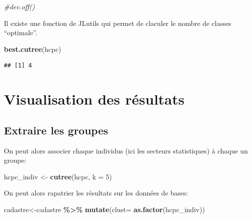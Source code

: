 \documentclass[
]{book}
\newenvironment{Shaded}{\begin{snugshade}}{\end{snugshade}}
\newcommand{\AttributeTok}[1]{\textcolor[rgb]{0.13,0.29,0.53}{#1}}
\newcommand{\CommentTok}[1]{\textcolor[rgb]{0.56,0.35,0.01}{\textit{#1}}}
\newcommand{\DecValTok}[1]{\textcolor[rgb]{0.00,0.00,0.81}{#1}}
\newcommand{\FunctionTok}[1]{\textcolor[rgb]{0.13,0.29,0.53}{\textbf{#1}}}
\newcommand{\NormalTok}[1]{#1}
\newcommand{\OtherTok}[1]{\textcolor[rgb]{0.56,0.35,0.01}{#1}}
\newcommand{\SpecialCharTok}[1]{\textcolor[rgb]{0.81,0.36,0.00}{\textbf{#1}}}
\begin{document}
\begin{Shaded}
\begin{Highlighting}[]
\CommentTok{\#dev.off()}
\end{Highlighting}
\end{Shaded}

Il existe une fonction de JLutils qui permet de claculer le nombre de classes ``optimale''.

\begin{Shaded}
\begin{Highlighting}[]
\FunctionTok{best.cutree}\NormalTok{(hcpc)}
\end{Highlighting}
\end{Shaded}

\begin{verbatim}
## [1] 4
\end{verbatim}

\hypertarget{visualisation-des-ruxe9sultats}{%
\section{Visualisation des résultats}\label{visualisation-des-ruxe9sultats}}

\hypertarget{extraire-les-groupes}{%
\subsection{Extraire les groupes}\label{extraire-les-groupes}}

On peut alors associer chaque individus (ici les secteurs statistiques) à chaque un groupe:

\begin{Shaded}
\begin{Highlighting}[]
\NormalTok{hcpc\_indiv }\OtherTok{\textless{}{-}} \FunctionTok{cutree}\NormalTok{(hcpc, }\AttributeTok{k =} \DecValTok{5}\NormalTok{)}
\end{Highlighting}
\end{Shaded}

On peut alors rapatrier les résultats sur les données de bases:

\begin{Shaded}
\begin{Highlighting}[]
\NormalTok{cadastre}\OtherTok{\textless{}{-}}\NormalTok{cadastre }\SpecialCharTok{\%\textgreater{}\%}
  \FunctionTok{mutate}\NormalTok{(}\AttributeTok{clust=} \FunctionTok{as.factor}\NormalTok{(hcpc\_indiv))}
\end{Highlighting}
\end{Shaded}
\end{document}
